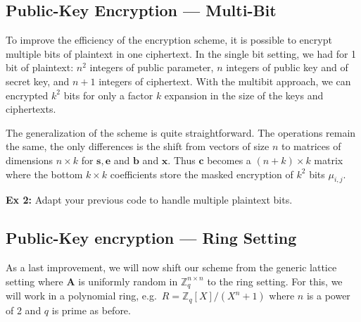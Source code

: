 \documentclass[10pt,a4paper,nobib]{tufte-handout}
\begin{document}
\subsection{Public-Key Encryption --- Multi-Bit}

To improve the efficiency of the encryption scheme, it is possible to encrypt multiple bits of plaintext in one ciphertext. In the single bit setting, we had for 1 bit of plaintext: $n^2$ integers of public parameter, $n$ integers of public key and of secret key, and $n+1$ integers of ciphertext. With the multibit approach, we can encrypted $k^2$ bits for only a factor $k$ expansion in the size of the keys and ciphertexts.

The generalization of the scheme is quite straightforward. The operations remain the same, the only differences is the shift from vectors of size $n$ to matrices of dimensions $n \times k$ for $\mathbf{s}, \mathbf{e}$ and $\mathbf{b}$ and $\mathbf{x}$. Thus $\mathbf{c}$ becomes a $(n+k) \times k$ matrix where the bottom $k\times k$ coefficients store the masked encryption of $k^2$ bits $\mu_{i,j}$.

\textbf{Ex 2:} Adapt your previous code to handle multiple plaintext bits.

\subsection{Public-Key encryption --- Ring Setting}

As a last improvement, we will now shift our scheme from the generic lattice setting where $\mathbf{A}$ is uniformly random in $\mathbb{Z}^{n\times n}_q$ to the ring setting. For this, we will work in a polynomial ring, e.g.~$R = \mathbb{Z}_q[X]/(X^n+1)$ where $n$ is a power of 2 and $q$ is prime as before.
\end{document}
